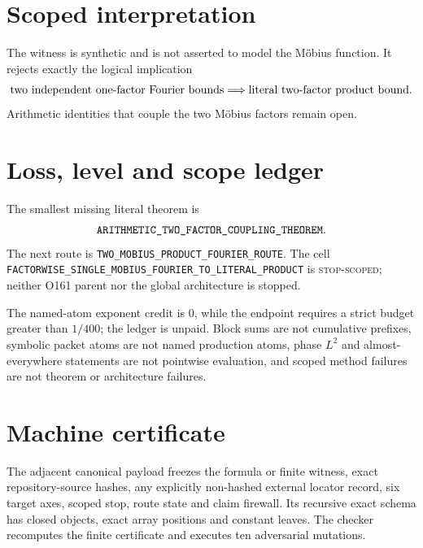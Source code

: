 \documentclass[11pt]{article}
\begin{document}
\section{Scoped interpretation}
The witness is synthetic and is not asserted to model the Möbius function.
It rejects exactly the logical implication
\[
 \hbox{two independent one-factor Fourier bounds}
 \Longrightarrow
 \hbox{literal two-factor product bound}.
\]
Arithmetic identities that couple the two Möbius factors remain open.


\section{Loss, level and scope ledger}
The smallest missing literal theorem is
\[
\texttt{ARITHMETIC\_\allowbreak{}TWO\_\allowbreak{}FACTOR\_\allowbreak{}COUPLING\_\allowbreak{}THEOREM}.
\]
The next route is \texttt{TWO\_\allowbreak{}MOBIUS\_\allowbreak{}PRODUCT\_\allowbreak{}FOURIER\_\allowbreak{}ROUTE}.
The cell \texttt{FACTORWISE\_\allowbreak{}SINGLE\_\allowbreak{}MOBIUS\_\allowbreak{}FOURIER\_\allowbreak{}TO\_\allowbreak{}LITERAL\_\allowbreak{}PRODUCT} is \textsc{stop-scoped}; neither O161 parent nor the global architecture is stopped.

The named-atom exponent credit is \(0\), while the endpoint requires a
strict budget greater than \(1/400\); the ledger is unpaid.  Block sums are
not cumulative prefixes, symbolic packet atoms are not named production
atoms, phase \(L^2\) and almost-everywhere statements are not pointwise
evaluation, and scoped method failures are not theorem or architecture
failures.

\section{Machine certificate}
The adjacent canonical payload freezes the formula or finite witness,
exact repository-source hashes, any explicitly non-hashed external locator
record, six target axes, scoped stop, route state and claim firewall.  Its
recursive exact schema has closed objects, exact array positions and
constant leaves.  The checker recomputes the finite certificate and executes
ten adversarial mutations.



\end{document}
